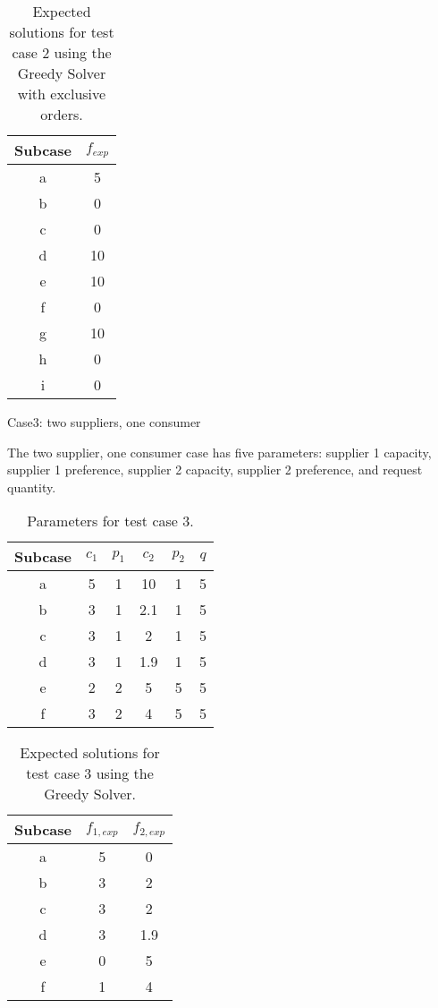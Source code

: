 \begin{table}[ht]
  \begin{center}
    \caption{Expected solutions for test case 2 using the Greedy Solver with 
      exclusive orders.}
    \begin{tabular}{cc}
    \toprule
    Subcase & $f_{exp}$\\
    \midrule
    a & 5  \\
    b & 0  \\
    c & 0  \\
    d & 10 \\
    e & 10 \\
    f & 0  \\
    g & 10 \\
    h & 0  \\
    i & 0  \\
    \bottomrule
    \end{tabular}
  \end{center}
\end{table}

Case3: two suppliers, one consumer

The two supplier, one consumer case has five parameters: supplier 1 capacity,
supplier 1 preference, supplier 2 capacity, supplier 2 preference, and request
quantity.

\begin{table}[ht]
  \begin{center}
    \caption{Parameters for test case 3.}
    \begin{tabular}{cccccc}
    \toprule
    Subcase & $c_1$ & $p_1$ & $c_2$ & $p_2$ & $q$ \\
    \midrule
    a & 5  & 1   & 10  & 1   & 5  \\
    b & 3  & 1   & 2.1 & 1   & 5  \\
    c & 3  & 1   & 2   & 1   & 5  \\
    d & 3  & 1   & 1.9 & 1   & 5  \\
    e & 2  & 2   & 5   & 5   & 5  \\
    f & 3  & 2   & 4   & 5   & 5  \\
    \bottomrule
    \end{tabular}
  \end{center}
\end{table}

\begin{table}[ht]
  \begin{center}
    \caption{Expected solutions for test case 3 using the Greedy Solver.}
    \begin{tabular}{ccc}
    \toprule
    Subcase & $f_{1, exp}$ & $f_{2, exp}$\\
    \midrule
    a & 5  & 0   \\
    b & 3  & 2   \\
    c & 3  & 2   \\
    d & 3  & 1.9 \\
    e & 0  & 5   \\
    f & 1  & 4   \\
    \bottomrule
    \end{tabular}
  \end{center}
\end{table}

